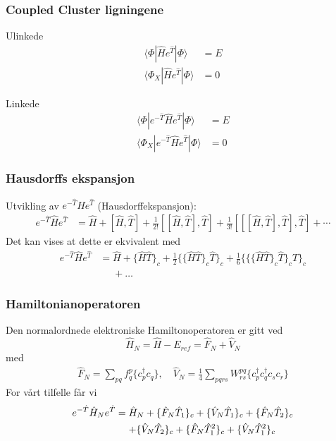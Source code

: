 \documentclass[norsk,a4paper,12pt]{beamer}
\begin{document}
  \begin{frame}
    \frametitle{Coupled Cluster ligningene}
    Ulinkede
    \begin{align}
    \langle\Phi|\hat{H}e^{\hat{T}}|\Phi\rangle&=E\\
    \langle\Phi_X|\hat{H}e^{\hat{T}}|\Phi\rangle&=0
    \end{align}
    
    Linkede
    \begin{align}
    \langle\Phi|e^{-\hat{T}}\hat{H}e^{\hat{T}}|\Phi\rangle&=E\\
    \langle\Phi_X|e^{-\hat{T}}\hat{H}e^{\hat{T}}|\Phi\rangle&=0
    \end{align}

  \end{frame}
  \begin{frame}
    \frametitle{Hausdorffs ekspansjon}
    Utvikling av $e^{-\hat{T}}\hat{H}e^{\hat{T}}$ (Hausdorffekspansjon):
    \begin{align*}
    e^{-\hat{T}}\hat{H}e^{\hat{T}}&=\hat{H}+[\hat{H},\hat{T}]+\frac{1}{2!}[[\hat{H},\hat{T}],\hat{T}]+\frac{1}{3!}[[[\hat{H},\hat{T}],\hat{T}],\hat{T}]+\cdots
    \end{align*}
	Det kan vises at dette er ekvivalent med
    \begin{align*}
    e^{-\hat{T}}\hat{H}e^{\hat{T}}&=\hat{H}+\{\hat{H}\hat{T}\}_c+\frac{1}{2}\{\{\hat{H}\hat{T}\}_c\hat{T}\}_c+\frac{1}{6}\{\{\{\hat{H}\hat{T}\}_c\hat{T}\}_c\hat{T}\}_c\\
    &\mathrel{\phantom{=}}+\hdots
    \end{align*}
  \end{frame}
  
  \begin{frame}
    \frametitle{Hamiltonianoperatoren}
    Den normalordnede elektroniske Hamiltonoperatoren er gitt ved
    \begin{equation}
    \hat{H}_N=\hat{H}-E_{ref}=\hat{F}_N+\hat{V}_N
    \end{equation}
    med
    \begin{align*}
    \hat{F}_N=\sum_{pq}f_q^p\{c_p^{\dagger}c_q\},\quad \hat{V}_N=\frac{1}{4}\sum_{pqrs}W_{rs}^{pq}\{c_p^{\dagger}c_q^{\dagger}c_sc_r\}
    \end{align*}
    For vårt tilfelle får vi
    \begin{align}
    e^{-\hat{T}}\hat{H}_Ne^{\hat{T}}&=\hat{H}_N+\{\hat{F}_N\hat{T}_1\}_c+\{\hat{V}_N\hat{T}_1\}_c+\{\hat{F}_N\hat{T}_2\}_c\notag\\
    &\mathrel{\phantom{=}}+\{\hat{V}_N\hat{T}_2\}_c+\{\hat{F}_N\hat{T}_1^2\}_c+\{\hat{V}_N\hat{T}_1^2\}_c
    \end{align}
  \end{frame}
  
\end{document}
